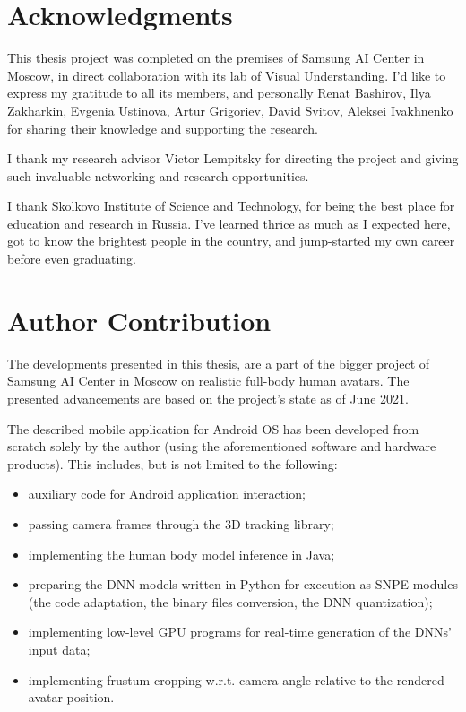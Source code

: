 \section*{\centering Acknowledgments}
This thesis project was completed on the premises of Samsung AI Center in Moscow, in direct collaboration with its lab of Visual Understanding. I'd like to express my gratitude to all its members, and personally Renat Bashirov, Ilya Zakharkin, Evgenia Ustinova, Artur Grigoriev, David Svitov, Aleksei Ivakhnenko for sharing their knowledge and supporting the research.

I thank my research advisor Victor Lempitsky for directing the project and giving such invaluable networking and research opportunities.

I thank Skolkovo Institute of Science and Technology, for being the best place for education and research in Russia. I've learned thrice as much as I expected here, got to know the brightest people in the country, and jump-started my own career before even graduating.

\section*{\centering Author Contribution}

The developments presented in this thesis, are a part of the bigger project of Samsung AI Center in Moscow on realistic full-body human avatars. The presented advancements are based on the project's state as of June 2021. 

The described mobile application for Android OS has been developed from scratch solely by the author (using the aforementioned software and hardware products). This includes, but is not limited to the following:
\begin{itemize}
	\item auxiliary code for Android application interaction;
	\item passing camera frames through the 3D tracking library;
	\item implementing the human body model \cite{dnn:smplx19} inference in Java;
	\item preparing the DNN models written in Python for execution as SNPE modules (the code adaptation, the binary files conversion, the DNN quantization);
	\item implementing low-level GPU programs for real-time generation of the DNNs' input data;
	\item implementing frustum cropping w.r.t. camera angle relative to the rendered avatar position.
\end{itemize}

